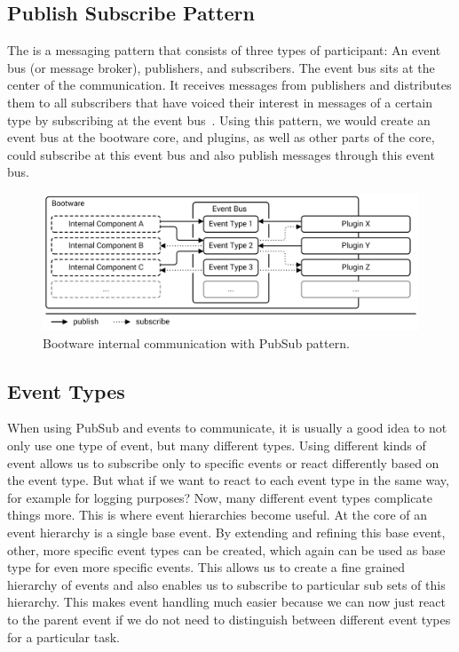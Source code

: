 \subsection{Publish Subscribe Pattern}

The  is a messaging pattern that consists of three types of participant: An event bus (or message broker), publishers, and subscribers.
The event bus sits at the center of the communication.
It receives messages from publishers and distributes them to all subscribers that have voiced their interest in messages of a certain type by subscribing at the event bus~\autocite{pubsub}.
Using this pattern, we would create an event bus at the bootware core, and plugins, as well as other parts of the core, could subscribe at this event bus and also publish messages through this event bus.

\begin{figure}[!htbp]
	\centering
	\includegraphics[resolution=600]{design/assets/pubsub}
	\caption{Bootware internal communication with PubSub pattern.}
	\label{image:pubsub}
\end{figure}

\subsection{Event Types}

When using PubSub and events to communicate, it is usually a good idea to not only use one type of event, but many different types.
Using different kinds of event allows us to subscribe only to specific events or react differently based on the event type.
But what if we want to react to each event type in the same way, for example for logging purposes?
Now, many different event types complicate things more.
This is where event hierarchies become useful.
At the core of an event hierarchy is a single base event.
By extending and refining this base event, other, more specific event types can be created, which again can be used as base type for even more specific events.
This allows us to create a fine grained hierarchy of events and also enables us to subscribe to particular sub sets of this hierarchy.
This makes event handling much easier because we can now just react to the parent event if we do not need to distinguish between different event types for a particular task.

